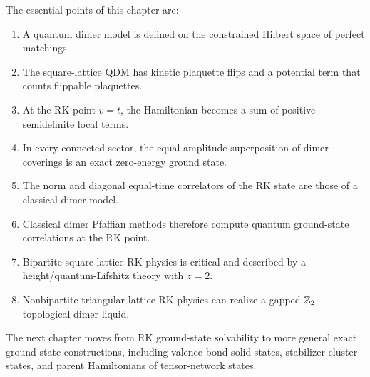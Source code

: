 The essential points of this chapter are:
\begin{enumerate}[label=(\roman*)]
    \item A quantum dimer model is defined on the constrained Hilbert space of
    perfect matchings.
    \item The square-lattice QDM has kinetic plaquette flips and a potential
    term that counts flippable plaquettes.
    \item At the RK point \(v=t\), the Hamiltonian becomes a sum of positive
    semidefinite local terms.
    \item In every connected sector, the equal-amplitude superposition of dimer
    coverings is an exact zero-energy ground state.
    \item The norm and diagonal equal-time correlators of the RK state are
    those of a classical dimer model.
    \item Classical dimer Pfaffian methods therefore compute quantum
    ground-state correlations at the RK point.
    \item Bipartite square-lattice RK physics is critical and described by a
    height/quantum-Lifshitz theory with \(z=2\).
    \item Nonbipartite triangular-lattice RK physics can realize a gapped
    \(\mathbb{Z}_2\) topological dimer liquid.
\end{enumerate}

The next chapter moves from RK ground-state solvability to more general exact
ground-state constructions, including valence-bond-solid states, stabilizer
cluster states, and parent Hamiltonians of tensor-network states.
